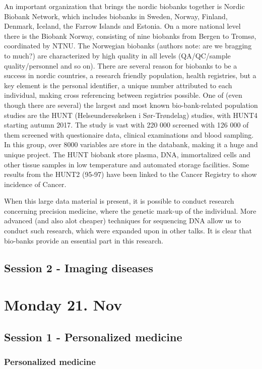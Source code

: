 \documentclass[12p]{article}
\begin{document}
An important organization that brings the nordic biobanks together is Nordic Biobank Network, which includes biobanks in Sweden, Norway, Finland, Denmark, Iceland, the Farrow Islands and Estonia.
On a more national level there is the Biobank Norway, consisting of nine biobanks from Bergen to Tromsø, coordinated by NTNU.
The Norwegian biobanks (authors note: are we bragging to much?) are characterized by high quality in all levels (QA/QC/sample quality/personnel and so on).
There are several reason for biobanks to be a success in nordic countries, a research friendly population, health registries, but a key element is the personal identifier, a unique number attributed to each individual, making cross referencing between registries possible.
One of (even though there are several) the largest and most known bio-bank-related population studies are the HUNT (Helseundersøkelsen i Sør-Trøndelag) studies, with HUNT4 starting autumn 2017.
The study is vast with 220 000 screened with 126 000 of them screened with questionaire data, clinical examinations and blood sampling.
In this group, over 8000 variables are store in the databank, making it a huge and unique project.
The HUNT biobank store plasma, DNA, immortalized cells and other tissue samples in low temperature and automated storage facilities.
Some results from the HUNT2 (95-97) have been linked to the Cancer Registry to show incidence of Cancer.

When this large data material is present, it is possible to conduct research concerning precision medicine, where the genetic mark-up of the individual.
More advanced (and also alot cheaper) techniques for sequencing DNA allow us to conduct such research, which were expanded upon in other talks.
It is clear that bio-banks provide an essential part in this research.

\subsection*{Session 2 - Imaging diseases}


\section*{Monday 21. Nov}

\subsection*{Session 1 - Personalized medicine}

\subsubsection{Personalized medicine}
\end{document}
